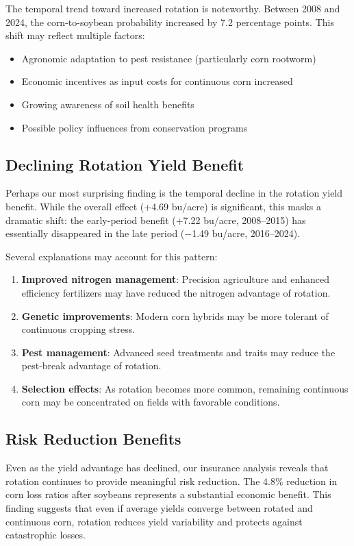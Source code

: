 \documentclass[12pt, a4paper]{article}
\begin{document}
The temporal trend toward increased rotation is noteworthy. Between 2008 and 2024, the corn-to-soybean probability increased by 7.2 percentage points. This shift may reflect multiple factors:
\begin{itemize}[noitemsep]
    \item Agronomic adaptation to pest resistance (particularly corn rootworm)
    \item Economic incentives as input costs for continuous corn increased
    \item Growing awareness of soil health benefits
    \item Possible policy influences from conservation programs
\end{itemize}

\subsection{Declining Rotation Yield Benefit}

Perhaps our most surprising finding is the temporal decline in the rotation yield benefit. While the overall effect (+4.69 bu/acre) is significant, this masks a dramatic shift: the early-period benefit (+7.22 bu/acre, 2008--2015) has essentially disappeared in the late period ($-$1.49 bu/acre, 2016--2024).

Several explanations may account for this pattern:
\begin{enumerate}[noitemsep]
    \item \textbf{Improved nitrogen management}: Precision agriculture and enhanced efficiency fertilizers may have reduced the nitrogen advantage of rotation.
    \item \textbf{Genetic improvements}: Modern corn hybrids may be more tolerant of continuous cropping stress.
    \item \textbf{Pest management}: Advanced seed treatments and traits may reduce the pest-break advantage of rotation.
    \item \textbf{Selection effects}: As rotation becomes more common, remaining continuous corn may be concentrated on fields with favorable conditions.
\end{enumerate}

\subsection{Risk Reduction Benefits}

Even as the yield advantage has declined, our insurance analysis reveals that rotation continues to provide meaningful risk reduction. The 4.8\% reduction in corn loss ratios after soybeans represents a substantial economic benefit. This finding suggests that even if average yields converge between rotated and continuous corn, rotation reduces yield variability and protects against catastrophic losses.
\end{document}
